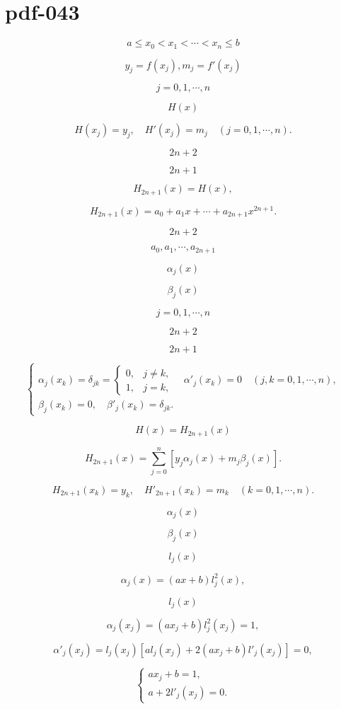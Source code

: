 \documentclass[fontset=fandol]{ctexart}
\begin{document}
\section*{pdf-043}

\[a\leqslant x_0<x_1<\cdots<x_n\leqslant b\]

\[y_j=f(x_j),m_j=f'(x_j)\]

\[j=0,1,\cdots,n\]

\[H(x)\]

\[
H(x_j)=y_j,\quad H'(x_j)=m_j\quad(j=0,1,\cdots,n).\tag{2.6.1}
\]

\[2n+2\]

\[2n+1\]

\[H_{2n+1}(x)=H(x),\]

\[H_{2n+1}(x)=a_0+a_1x+\cdots+a_{2n+1}x^{2n+1}.\]

\[2n+2\]

\[a_0,a_1,\cdots,a_{2n+1}\]

\[\alpha_j(x)\]

\[\beta_j(x)\]

\[j=0,1,\cdots,n\]

\[2n+2\]

\[2n+1\]

\[
\begin{cases}
\alpha_j(x_k)=\delta_{jk}=\begin{cases}0,&j\ne k,\\1,&j=k,\end{cases}\quad \alpha'_j(x_k)=0\quad(j,k=0,1,\cdots,n),\\
\beta_j(x_k)=0,\quad \beta'_j(x_k)=\delta_{jk}.
\end{cases}\tag{2.6.2}
\]

\[H(x)=H_{2n+1}(x)\]

\[H_{2n+1}(x)=\sum_{j=0}^{n}[y_j\alpha_j(x)+m_j\beta_j(x)].\tag{2.6.3}\]

\[H_{2n+1}(x_k)=y_k,\quad H'_{2n+1}(x_k)=m_k\quad(k=0,1,\cdots,n).\]

\[\alpha_j(x)\]

\[\beta_j(x)\]

\[l_j(x)\]

\[\alpha_j(x)=(ax+b)l_j^2(x),\]

\[l_j(x)\]

\[\alpha_j(x_j)=(ax_j+b)l_j^2(x_j)=1,\]

\[\alpha'_j(x_j)=l_j(x_j)[al_j(x_j)+2(ax_j+b)l'_j(x_j)]=0,\]

\[\begin{cases}ax_j+b=1,\\a+2l'_j(x_j)=0.\end{cases}\]
\end{document}

